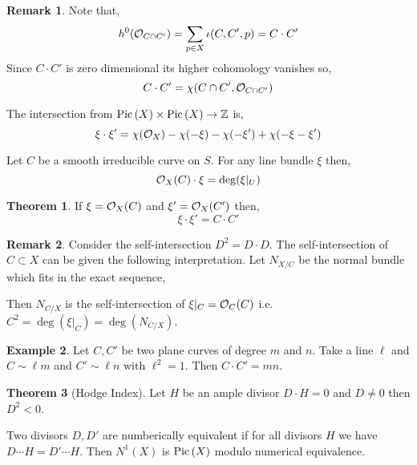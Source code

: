 \documentclass[12pt]{extarticle}
\newcommand{\Z}{\mathbb{Z}}
\theoremstyle{definition}
\newtheorem{theorem}{Theorem}[section]
\newtheorem{example}[theorem]{Example}
\newtheorem{remark}{Remark}
\newenvironment{definition}[1][Definition:]{\begin{trivlist}
\item[\hskip \labelsep {\bfseries #1}]}{\end{trivlist}}
\begin{document}
\begin{remark}
Note that,
\[ h^0(\mathcal{O}_{C \cap C'}) = \sum_{p \in X} \iota(C, C', p) = C \cdot C' \]
Since $C \cdot C'$ is zero dimensional its higher cohomology vanishes so,
\[ C \cdot C' = \chi(C \cap C', \mathcal{O}_{C \cap C'}) \]
\end{remark}

\begin{definition}
The intersection from $\Pic{X} \times \Pic{X} \to \Z$ is,
\[ \xi \cdot \xi' = \chi(\mathcal{O}_{X}) - \chi(-\xi) - \chi(-\xi') + \chi(- \xi - \xi') \]
\end{definition}

\begin{definition}
Let $C$ be a smooth irreducible curve on $S$. For any line bundle $\xi$ then,
\[ \mathcal{O}_{X}(C) \cdot \xi = \deg(\xi|_U) \]
\end{definition}

\begin{theorem}
If $\xi = \mathcal{O}_{X}(C)$ and $\xi' = \mathcal{O}_{X}(C')$ then,
\[ \xi \cdot \xi' = C \cdot C' \] 
\end{theorem}

\begin{remark}
Consider the self-intersection $D^2 = D \cdot D$. The self-intersection of $C \subset X$ can be given the following interpretation. Let $N_{X/C}$ be the normal bundle which fits in the exact sequence,
\begin{center}
\end{center}
Then $N_{C/X}$ is the self-intersection of $\xi|_C = \mathcal{O}_{C}(C)$ i.e. $C^2 = \deg(\xi|_C) = \deg(N_{C/X})$. 
\end{remark}

\begin{example}
Let $C, C'$ be two plane curves of degree $m$ and $n$. Take a line $\ell$ and $C \sim \ell m$ and $C' \sim \ell n$ with $\ell^2 = 1$. Then $C \cdot C' = m n$. 
\end{example}

\begin{theorem}[Hodge Index]
Let $H$ be an ample divisor $D \cdot H = 0$ and $D \neq 0$ then $D^2 < 0$. 
\end{theorem}

\begin{definition}
Two divisors $D, D'$ are numberically equivalent if for all divisors $H$ we have $D \cdots H = D' \cdots H$. Then $N^1(X)$ is $\mathrm{Pic}\left( X \right)$ modulo numerical equivalence. 
\end{definition}
\end{document}

